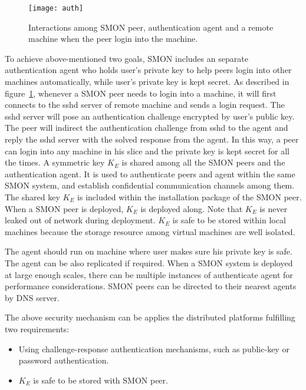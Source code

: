 \begin{figure}
\centering
\texttt{[image: auth]}
\caption{Interactions among SMON peer, authentication agent
and a remote machine when the peer login into the machine.}
\label{fig:auth}
\end{figure}

To achieve above-mentioned two goals, SMON includes an
separate authentication agent who holds user's private key
to help peers login into other machines automatically, while
user's private key is kept secret. As described in
figure~\ref{fig:auth}, whenever a SMON peer needs to login
into a machine, it will first connects to the sshd server of
remote machine and sends a login request. The sshd server
will pose an authentication challenge encrypted by user's
public key. The peer will indirect the authentication
challenge from sshd to the agent and reply the sshd server
with the solved response from the agent. In this way, a peer
can login into any machine in his slice and the private key
is kept secret for all the times. A symmetric key $K_E$ is
shared among all the SMON peers and the authentication
agent. It is used to authenticate peers and agent within the
same SMON system, and establish confidential communication
channels among them. The shared key $K_E$ is included within
the installation package of the SMON peer. When a SMON peer
is deployed, $K_E$ is deployed along. Note that $K_E$ is
never leaked out of network during deployment. $K_E$ is safe
to be stored within local machines because the storage
resource among virtual machines are well isolated.


The agent should run on machine where user makes sure his
private key is safe. The agent can be also replicated if
required. When a SMON system is deployed at large enough
scales, there can be multiple instances of authenticate
agent for performance considerations. SMON peers can be
directed to their nearest agents by DNS server.

The above security mechanism can be applies the distributed
platforms fulfilling two requirements:

\begin{itemize}

  \item Using challenge-response authentication mechanisms,
  such as public-key or password authentication.

  \item $K_E$ is safe to be stored with SMON peer.

\end{itemize}

